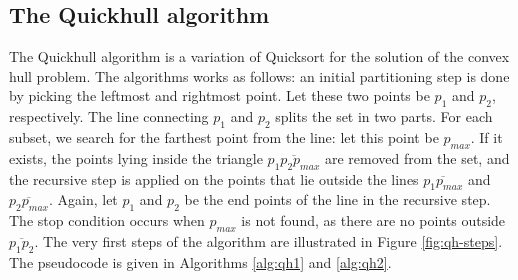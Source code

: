\documentclass[]{finalproject}
\begin{document}
\subsection{The Quickhull algorithm}
The Quickhull algorithm is a variation of Quicksort for the solution of the convex hull problem.
The algorithms works as follows:
an initial partitioning step is done by picking the leftmost and rightmost point.
Let these two points be $p_1$ and $p_2$, respectively.
The line connecting $p_1$ and $p_2$ splits the set in two parts.
For each subset, we search for the farthest point from the line: let this point be $p_{max}$.
If it exists, the points lying inside the triangle $\overline{p_1p_2p_{max}}$ are removed from the set,
and the recursive step is applied on the points that lie outside the lines $\overline{p_1p_{max}}$ and $\overline{p_2p_{max}}$.
Again, let $p_1$ and $p_2$ be the end points of the line in the recursive step.
The stop condition occurs when $p_{max}$ is not found, as there are no points outside $\overline{p_1p_2}$.
The very first steps of the algorithm are illustrated in Figure \ref{fig:qh-steps}.
The pseudocode is given in Algorithms \ref{alg:qh1} and \ref{alg:qh2}.
\end{document}
